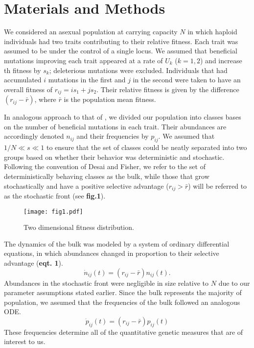 \documentclass[9pt,twocolumn,twoside]{gsajnl}
\begin{document}
\section{Materials and Methods}
\label{sec:materials:methods}

We considered an asexual population at carrying capacity $N$ in which haploid individuals had two traits contributing to their relative fitness. Each trait was assumed to be under the control of a single locus. We assumed that beneficial mutations improving each trait appeared at a rate of $U_k$ ($k=1,2$) and increase th fitness by $s_k$; deleterious mutations were excluded. Individuals that had accumulated $i$ mutations in the first and $j$ in the second were taken to have an overall fitness of $r_{ij} = i s_1+j s_2$.  Their relative fitness is given by the difference $(r_{ij}-\bar{r})$, where  $\bar{r} $  is the population mean fitness.  

In analogous approach to that of \cite{desai2007beneficial}, we divided our population into classes bases on the number of beneficial mutations in each trait. Their abundances are accordingly denoted $n_{ij}$ and their frequencies by $p_{ij}$. We assumed that $1/N \ll s \ll 1$ to ensure that the set of classes could be neatly separated into two groups based on whether their behavior was deterministic and stochastic. Following the convention of Desai and Fisher, we refer to the set of deterministically behaving classes as the bulk, while those that grow stochastically and have a positive selective advantage ($r_{ij}>\bar{r}$) will be referred to as the stochastic front (see \textbf{fig.1}).\par

\begin{figure}
\texttt{[image: fig1.pdf]}
\label{Figure 1.}
\caption{Two dimensional fitness distribution.}
\end{figure}

The dynamics of the bulk was modeled by a system of ordinary differential equations, in which abundances changed in proportion to their selective advantage (\textbf{eqt. 1}). 
\begin{equation} 
\dot{n}_{ij}(t) = (r_{ij}-\bar{r}) n_{ij}(t). 
\end{equation}
Abundances in the stochastic front were negligible in size relative to $N$ due to our parameter assumptions stated earlier.  Since the bulk represents the majority of population, we assumed that the frequencies of the bulk followed an analogous ODE.
\begin{equation} 
\dot{p}_{ij}(t) = (r_{ij}-\bar{r}) p_{ij}(t) 
\end{equation}
These frequencies determine all of the quantitative genetic measures that are of interest to us.\par
\end{document}
